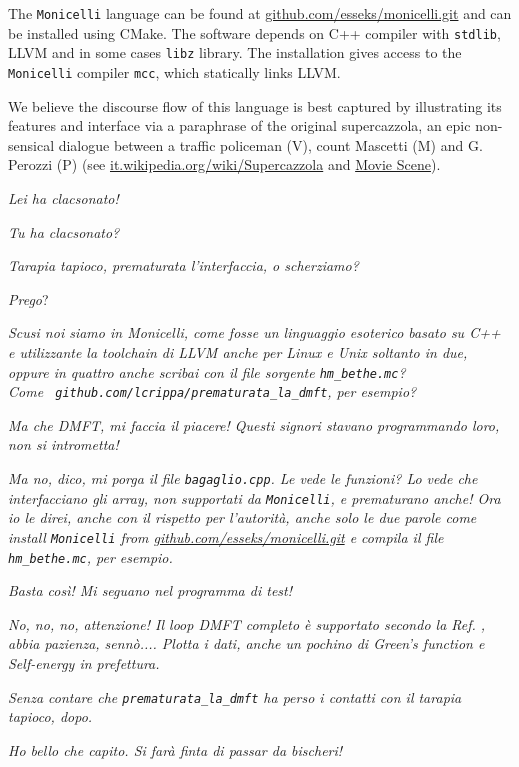 \documentclass[edipack_sp.tex]{subfiles}
\begin{document}
The {\tt Monicelli} language can be found at
\href{https://github.com/esseks/monicelli.git}{github.com/esseks/monicelli.git}
and can be installed using CMake. The software depends on C++
compiler with {\tt stdlib}, LLVM and in some cases {\tt libz} library. The installation gives access to the {\tt
  Monicelli} compiler {\tt mcc}, which statically links LLVM. 

We believe the discourse flow of this language is best captured by 
illustrating its features and \NAME interface via a paraphrase of the original supercazzola, an epic non-sensical dialogue between a traffic policeman (V), count Mascetti (M) and G. Perozzi (P) (see
\href{https://it.wikipedia.org/wiki/Supercazzola#Origine}{it.wikipedia.org/wiki/Supercazzola}
and \href{https://www.youtube.com/watch?v=SF8YUFdP6eU}{Movie Scene}). 

\begin{dialogue}
 {\it Lei ha clacsonato!}

 {\it Tu ha clacsonato?}
\par\lips\par

 {\it Tarapia tapioco, prematurata l'interfaccia, o scherziamo?}

 {\it Prego}?

 {\it Scusi noi siamo in Monicelli, come fosse un linguaggio esoterico basato su C++ e utilizzante la toolchain di LLVM anche per Linux e Unix soltanto in due, oppure in quattro anche scribai con il file
sorgente {\tt hm\_bethe.mc}? \\ Come {\tt
  github.com/lcrippa/prematurata\_la\_dmft}, per esempio?}

 {\it Ma che DMFT, mi faccia il piacere! Questi signori stavano programmando loro, non si intrometta!}

 {\it Ma no, dico, mi porga il file {\tt bagaglio.cpp}. Le vede le funzioni? Lo vede che interfacciano gli array, non supportati da {\tt Monicelli}, e prematurano anche! 
Ora io le direi, anche con il rispetto per l'autorità, anche solo le
due parole come install {\tt Monicelli} from
\href{https://github.com/esseks/monicelli.git}{github.com/esseks/monicelli.git}
e compila il file {\tt hm\_bethe.mc}, per esempio.}

 {\it Basta così! Mi seguano nel programma di test!}

 {\it No, no, no, attenzione! Il loop DMFT completo \`e supportato secondo la Ref. \cite{Georges1996RMP}, abbia pazienza,
senn\`o.... Plotta i dati, anche un pochino di Green's function e
Self-energy in prefettura.}

 {\it Senza contare che {\tt prematurata\_la\_dmft} ha perso i contatti con il tarapia tapioco, dopo.}

\par\lips\par

 {\it Ho bello che capito. Si farà finta di passar da bischeri!}
\end{dialogue}
\end{document}
